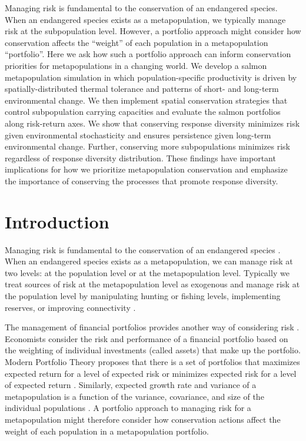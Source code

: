 Managing risk is fundamental to the conservation of an endangered species. When an endangered species exists as a metapopulation, we typically manage risk at the subpopulation level. However, a portfolio approach might consider how conservation affects the ``weight'' of each population in a metapopulation ``portfolio''. Here we ask how such a portfolio approach can inform conservation priorities for metapopulations in a changing world. We develop a salmon metapopulation simulation in which population-specific productivity is driven by spatially-distributed thermal tolerance and patterns of short- and long-term environmental change. We then implement spatial conservation strategies that control subpopulation carrying capacities and evaluate the salmon portfolios along risk-return axes. We show that conserving response diversity minimizes risk given environmental stochasticity and ensures persistence given long-term environmental change. Further, conserving more subpopulations minimizes risk regardless of response diversity distribution. These findings have important implications for how we prioritize metapopulation conservation and emphasize the importance of conserving the processes that promote response diversity.

\section{Introduction}

Managing risk is fundamental to the conservation of an endangered species \citep{burgman2005, iucn2009}. When an endangered species exists as a metapopulation, we can manage risk at two levels: at the population level or at the metapopulation level. Typically we treat sources of risk at the metapopulation level as exogenous and manage risk at the population level by manipulating hunting or fishing levels, implementing reserves, or improving connectivity \citep[e.g.][]{akcakaya2007}.

The management of financial portfolios provides another way of considering risk \citep{figge2004, koellner2006, ando2012}. Economists consider the risk and performance of a financial portfolio based on the weighting of individual investments (called assets) that make up the portfolio. Modern Portfolio Theory proposes that there is a set of portfolios that maximizes expected return for a level of expected risk or minimizes expected risk for a level of expected return \citep{markowitz1952, markowitz1959}. Similarly, expected growth rate and variance of a metapopulation is a function of the variance, covariance, and size of the individual populations \citep{moore2010}. A portfolio approach to managing risk for a metapopulation might therefore consider how conservation actions affect the weight of each population in a metapopulation portfolio.

